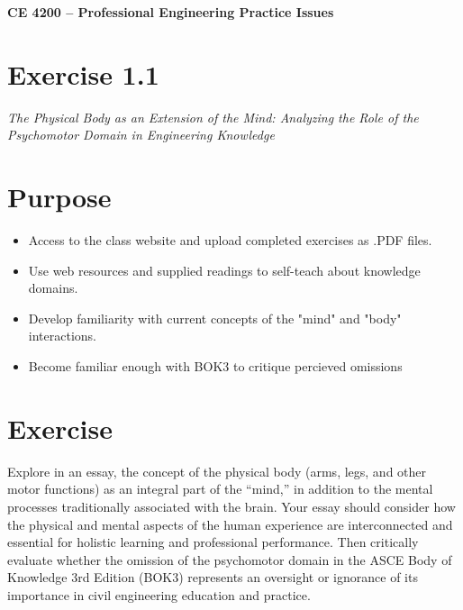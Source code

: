 \documentclass[12pt]{article}
\begin{document}
\begin{center}
{\textbf{{ CE 4200 -- Professional Engineering Practice Issues} }}
\end{center}

\section*{\small{Exercise 1.1}} 
\emph{The Physical Body as an Extension of the Mind: Analyzing the Role of the Psychomotor Domain in Engineering Knowledge}


\section*{\small{Purpose}} 
\begin{itemize}
\item Access to the class website and upload completed exercises as .PDF files.
\item Use web resources and supplied readings to self-teach about knowledge domains.
\item Develop familiarity with current concepts of the "mind" and "body" interactions.
\item Become familiar enough with BOK3 to critique percieved omissions
\end{itemize}

\section*{\small{Exercise}}
Explore in an essay, the concept of the physical body (arms, legs, and other motor functions) as an integral part of the ``mind,'' in addition to the mental processes traditionally associated with the brain. Your essay should consider how the physical and mental aspects of the human experience are interconnected and essential for holistic learning and professional performance. Then critically evaluate whether the omission of the psychomotor domain in the ASCE Body of Knowledge 3rd Edition (BOK3) represents an oversight or ignorance of its importance in civil engineering education and practice.
\end{document}
